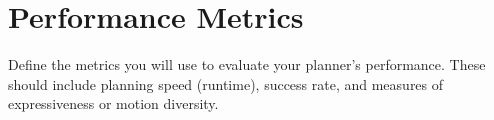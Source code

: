 \section{Performance Metrics}

\begin{outline}
  Define the metrics you will use to evaluate your planner's
  performance. These should include planning speed (runtime), success
  rate, and measures of expressiveness or motion diversity.
\end{outline}
